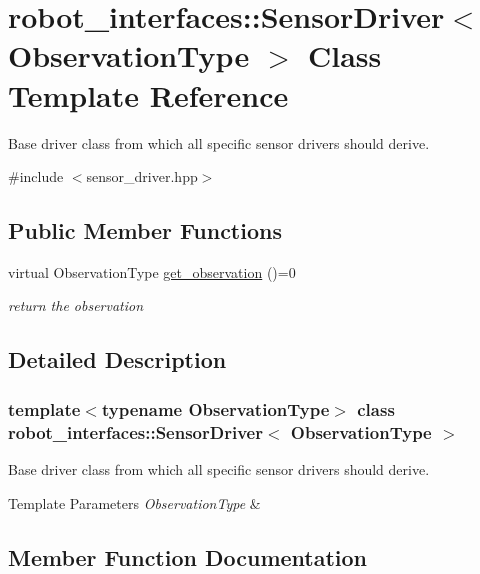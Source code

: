 \hypertarget{classrobot__interfaces_1_1SensorDriver}{}\section{robot\+\_\+interfaces\+:\+:Sensor\+Driver$<$ Observation\+Type $>$ Class Template Reference}
\label{classrobot__interfaces_1_1SensorDriver}


Base driver class from which all specific sensor drivers should derive.  




{\ttfamily \#include $<$sensor\+\_\+driver.\+hpp$>$}

\subsection*{Public Member Functions}
\begin{DoxyCompactItemize}
\item 
virtual Observation\+Type \hyperlink{classrobot__interfaces_1_1SensorDriver_a59a9918c43ba789dffb6e59f9790c6c2}{get\+\_\+observation} ()=0
\begin{DoxyCompactList}\small\item\em return the observation \end{DoxyCompactList}\end{DoxyCompactItemize}


\subsection{Detailed Description}
\subsubsection*{template$<$typename Observation\+Type$>$\newline
class robot\+\_\+interfaces\+::\+Sensor\+Driver$<$ Observation\+Type $>$}

Base driver class from which all specific sensor drivers should derive. 


\begin{DoxyTemplParams}{Template Parameters}
{\em Observation\+Type} & \\
\hline
\end{DoxyTemplParams}


\subsection{Member Function Documentation}
\mbox{\label{classrobot__interfaces_1_1SensorDriver_a59a9918c43ba789dffb6e59f9790c6c2}} 
